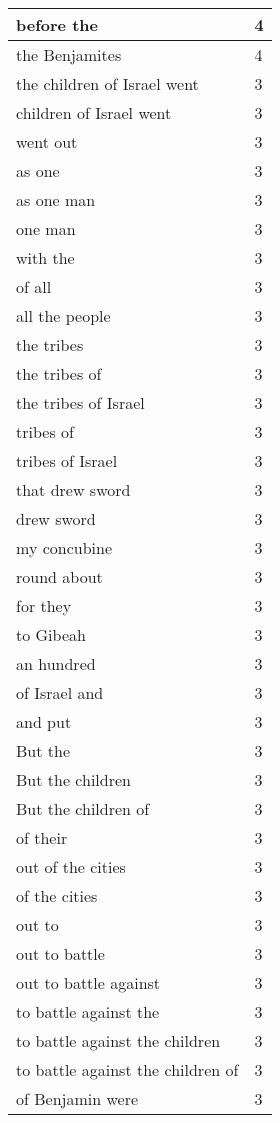 \begin{center}
\begin{longtable}{|p{3.0in}|p{0.5in}|}
before the & 4\\ \hline 
the Benjamites & 4\\ \hline 
the children of Israel went & 3\\ \hline 
children of Israel went & 3\\ \hline 
went out & 3\\ \hline 
as one & 3\\ \hline 
as one man & 3\\ \hline 
one man & 3\\ \hline 
with the & 3\\ \hline 
of all & 3\\ \hline 
all the people & 3\\ \hline 
the tribes & 3\\ \hline 
the tribes of & 3\\ \hline 
the tribes of Israel & 3\\ \hline 
tribes of & 3\\ \hline 
tribes of Israel & 3\\ \hline 
that drew sword & 3\\ \hline 
drew sword & 3\\ \hline 
my concubine & 3\\ \hline 
round about & 3\\ \hline 
for they & 3\\ \hline 
to Gibeah & 3\\ \hline 
an hundred & 3\\ \hline 
of Israel and & 3\\ \hline 
and put & 3\\ \hline 
But the & 3\\ \hline 
But the children & 3\\ \hline 
But the children of & 3\\ \hline 
of their & 3\\ \hline 
out of the cities & 3\\ \hline 
of the cities & 3\\ \hline 
out to & 3\\ \hline 
out to battle & 3\\ \hline 
out to battle against & 3\\ \hline 
to battle against the & 3\\ \hline 
to battle against the children & 3\\ \hline 
to battle against the children of & 3\\ \hline 
of Benjamin were & 3\\ \hline 

\end{longtable}
\end{center}
